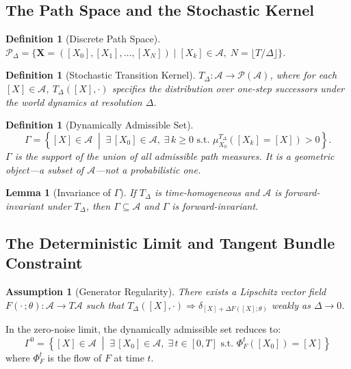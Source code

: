\documentclass[12pt, oneside]{article}
\newtheorem{lemma}[theorem]{Lemma}
\newtheorem{definition}[theorem]{Definition}
\newtheorem{assumption}[theorem]{Assumption}
\begin{document}
\subsection{The Path Space and the Stochastic Kernel}

\begin{definition}[Discrete Path Space]
$\mathcal{P}_\Delta = \{ \mathbf{X} = ([X_0],[X_1],\ldots,[X_N]) \mid [X_k] \in \mathcal{A},\;
N = \lfloor T/\Delta \rfloor \}$.
\end{definition}

\begin{definition}[Stochastic Transition Kernel]
$T_\Delta : \mathcal{A} \to \mathcal{P}(\mathcal{A})$, where for each $[X] \in \mathcal{A}$,
$T_\Delta([X],\cdot)$ specifies the distribution over one-step successors under the world
dynamics at resolution $\Delta$.
\end{definition}

\begin{definition}[Dynamically Admissible Set]
\[
\Gamma = \left\{ [X] \in \mathcal{A} \;\middle|\;
\exists\, [X_0] \in \mathcal{A},\; \exists\, k \ge 0 \text{ s.t. }
\mu_{X_0}^{T_\Delta}([X_k] = [X]) > 0 \right\}.
\]
$\Gamma$ is the support of the union of all admissible path measures. It is a geometric
object---a subset of $\mathcal{A}$---not a probabilistic one.
\end{definition}

\begin{lemma}[Invariance of $\Gamma$]
If $T_\Delta$ is time-homogeneous and $\mathcal{A}$ is forward-invariant under $T_\Delta$,
then $\Gamma \subseteq \mathcal{A}$ and $\Gamma$ is forward-invariant.
\end{lemma}

\subsection{The Deterministic Limit and Tangent Bundle Constraint}

\begin{assumption}[Generator Regularity]
\label{ass:generator}
There exists a Lipschitz vector field $F(\cdot\,;\theta) : \mathcal{A} \to T\mathcal{A}$
such that $T_\Delta([X],\cdot) \Rightarrow \delta_{[X]+\Delta F([X];\theta)}$ weakly as
$\Delta \to 0$.
\end{assumption}

In the zero-noise limit, the dynamically admissible set reduces to:
\[
\Gamma^0 = \left\{ [X] \in \mathcal{A} \;\middle|\;
\exists\, [X_0] \in \mathcal{A},\; \exists\, t \in [0,T] \text{ s.t. }
\Phi^t_F([X_0]) = [X] \right\}
\]
where $\Phi^t_F$ is the flow of $F$ at time $t$.
\end{document}
